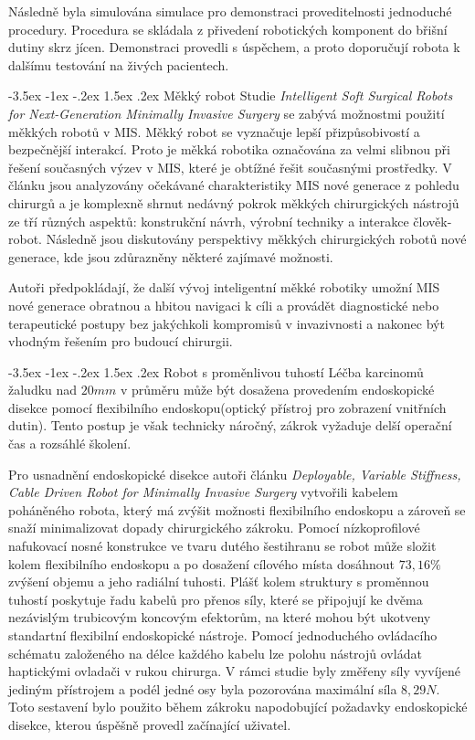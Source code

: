 \documentclass[10pt, a4paper]{article}
\makeatletter
\theoremstyle{definition}
\renewcommand\subsection{\@startsection {subsection}{1}{\z@}%
                                   {-3.5ex \@plus -1ex \@minus -.2ex}%
                                   {1.5ex \@plus.2ex}%
                                   {\normalsize\bfseries}}
\makeatother
\begin{document}
Následně byla simulována simulace pro demonstraci proveditelnosti
jednoduché procedury. Procedura se skládala z přivedení robotických 
komponent do břišní dutiny skrz jícen. Demonstraci provedli s úspěchem,
a proto doporučují robota k dalšímu testování na živých pacientech.

\subsection{Měkký robot}
\label{subsec:soft}
Studie \textit{Intelligent Soft Surgical Robots for Next-Generation Minimally Invasive Surgery} \cite{intelligent_soft_robot}
se zabývá možnostmi použití měkkých robotů v MIS.
Měkký robot se vyznačuje lepší přizpůsobivostí a bezpečnější
interakcí. Proto je měkká robotika označována za velmi slibnou při řešení 
současných výzev v MIS, které je obtížné řešit současnými prostředky.
V článku jsou analyzovány očekávané charakteristiky MIS nové generace
z pohledu chirurgů a je komplexně shrnut nedávný pokrok
měkkých chirurgických nástrojů ze tří různých aspektů: konstrukční
návrh, výrobní techniky a interakce člověk-robot.
Následně jsou diskutovány perspektivy měkkých chirurgických robotů
nové generace, kde jsou zdůrazněny některé zajímavé možnosti.

Autoři předpokládají, že další vývoj inteligentní měkké robotiky
umožní MIS nové generace obratnou a hbitou navigaci k cíli a provádět
diagnostické nebo terapeutické postupy bez jakýchkoli kompromisů
v invazivnosti a nakonec být vhodným řešením pro budoucí chirurgii.

\subsection{Robot s proměnlivou tuhostí}
\label{subsec:stiffness}
Léčba karcinomů žaludku nad $20mm$ v průměru může být dosažena
provedením endoskopické disekce pomocí flexibilního endoskopu(optický přístroj pro zobrazení vnitřních dutin).
Tento postup je však technicky náročný, zákrok vyžaduje delší
operační čas a rozsáhlé školení.

Pro usnadnění endoskopické disekce
autoři článku \textit{Deployable, Variable Stiffness, Cable Driven Robot for Minimally Invasive Surgery} \cite{variable_stiffness_robot}
vytvořili kabelem poháněného robota, který má zvýšit
možnosti flexibilního endoskopu a zároveň se snaží
minimalizovat dopady chirurgického zákroku.
Pomocí nízkoprofilové nafukovací nosné konstrukce ve tvaru
dutého šestihranu se robot může složit kolem flexibilního
endoskopu a po dosažení cílového místa dosáhnout $73,16\%$ zvýšení objemu
a jeho radiální tuhosti.
Plášť kolem struktury s proměnnou tuhostí poskytuje řadu kabelů pro přenos
síly, které se připojují ke dvěma nezávislým trubicovým koncovým efektorům,
na které mohou být ukotveny standartní flexibilní endoskopické nástroje.
Pomocí jednoduchého ovládacího schématu založeného na délce
každého kabelu lze polohu nástrojů ovládat haptickými ovladači v rukou chirurga.
V rámci studie byly změřeny síly vyvíjené jediným přístrojem a podél jedné
osy byla pozorována maximální síla $8,29N$. Toto sestavení bylo použito během zákroku
napodobující požadavky endoskopické disekce, kterou úspěšně provedl
začínající uživatel.
\end{document}
